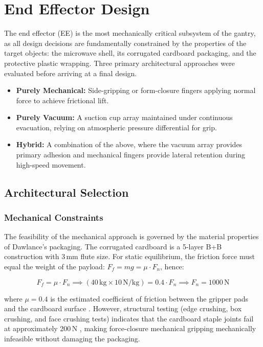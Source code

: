 \chapter{End Effector Design}
\label{sec:ee_design}

The end effector (EE) is the most mechanically critical subsystem of the gantry, 
as all design decisions are fundamentally constrained by the properties of the 
target objects: the microwave shell, its corrugated cardboard packaging, and the 
protective plastic wrapping. Three primary architectural approaches were evaluated 
before arriving at a final design.

\begin{itemize}
    \item \textbf{Purely Mechanical:} Side-gripping or form-closure fingers 
        applying normal force to achieve frictional lift.
    \item \textbf{Purely Vacuum:} A suction cup array maintained under continuous 
        evacuation, relying on atmospheric pressure differential for grip.
    \item \textbf{Hybrid:} A combination of the above, where the vacuum array 
        provides primary adhesion and mechanical fingers provide lateral retention 
        during high-speed movement.
\end{itemize}

\section{Architectural Selection}

\subsection{Mechanical Constraints}

The feasibility of the mechanical approach is governed by the material 
properties of Dawlance's packaging. The corrugated cardboard is a 5-layer 
B+B construction with 3\,mm flute size. For static equilibrium, the friction force must equal the weight of the payload:
$F_f = mg = \mu \cdot F_n$, hence:

$$ F_f = \mu \cdot F_n \implies (40\,\text{kg} \times 10\,\text{N/kg}) 
= 0.4 \cdot F_n \implies F_n = 1000\,\text{N} $$

where $\mu = 0.4$ is the estimated coefficient of friction between the gripper 
pads and the cardboard surface \cite{rudawska2024}. However, structural testing 
(edge crushing, box crushing, and face crushing tests) indicates that the 
cardboard staple joints fail at approximately 200\,N \cite{singh2009}, 
making force-closure mechanical gripping mechanically infeasible without 
damaging the packaging.


